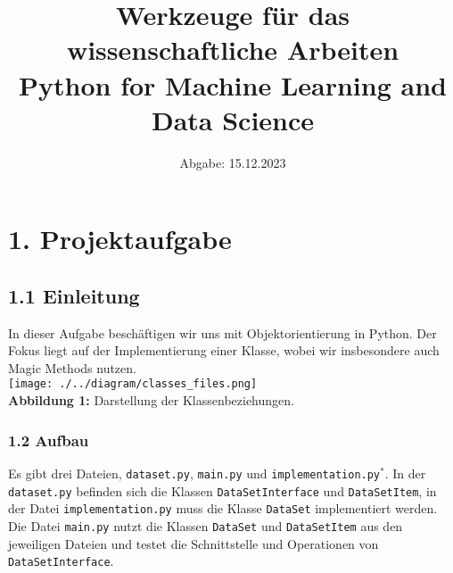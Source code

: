 \documentclass{article}
\begin{document}
\title{\textbf{\Large Werkzeuge für das wissenschaftliche Arbeiten}\\
 \normalsize Python for Machine Learning and Data Science}
\date{Abgabe: 15.12.2023}
\maketitle

\renewcommand{\contentsname}{Inhaltsverzeichnis} 
\tableofcontents 

\vspace{2em}

\section*{1. Projektaufgabe}

\subsection*{1.1 Einleitung}
In dieser Aufgabe beschäftigen wir uns mit Objektorientierung in Python. Der Fokus liegt auf der Implementierung einer Klasse, wobei wir insbesondere auch Magic Methods nutzen.\\
\texttt{[image: ./../diagram/classes\_files.png]}\\
\hspace*{3cm}\scriptsize\textbf{Abbildung 1:} Darstellung der Klassenbeziehungen.\normalsize

\newpage
\subsubsection*{1.2 Aufbau}
Es gibt drei Dateien, \texttt{dataset.py}, \texttt{main.py} und \texttt{implementation.py}$^{*}$. In der \texttt{dataset.py} befinden sich die Klassen \texttt{DataSetInterface} und \texttt{DataSetItem}, in der Datei \texttt{implementation.py} muss die Klasse \texttt{DataSet} implementiert werden. Die Datei \texttt{main.py} nutzt die Klassen \texttt{DataSet} und \texttt{DataSetItem} aus den jeweiligen Dateien und testet die Schnittstelle und Operationen von \texttt{DataSetInterface}.\\
\end{document}
